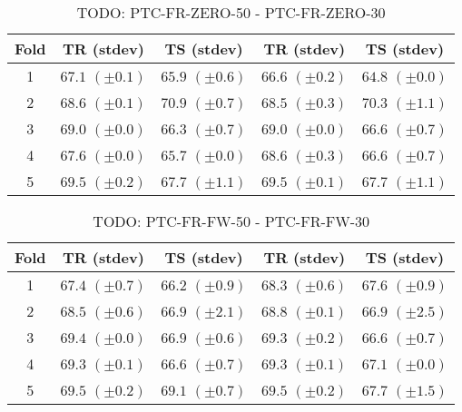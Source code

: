 \documentclass[10pt,a4paper]{book}
\begin{document}
\clearpage


\begin{table}[tbph]
\caption{TODO: PTC-FR-ZERO-50 - PTC-FR-ZERO-30}
\label{TODO}
\centering
\begin{tabular}{c*{4}{c}}
\toprule
Fold & TR (stdev) & TS (stdev) & TR (stdev) & TS (stdev)\\
\midrule
1 & $67.1$ $(\pm 0.1)$ & $65.9$ $(\pm 0.6)$ & $66.6$ $(\pm 0.2)$ & $64.8$ $(\pm 0.0)$\\
2 & $68.6$ $(\pm 0.1)$ & $70.9$ $(\pm 0.7)$ & $68.5$ $(\pm 0.3)$ & $70.3$ $(\pm 1.1)$\\
3 & $69.0$ $(\pm 0.0)$ & $66.3$ $(\pm 0.7)$ & $69.0$ $(\pm 0.0)$ & $66.6$ $(\pm 0.7)$\\
4 & $67.6$ $(\pm 0.0)$ & $65.7$ $(\pm 0.0)$ & $68.6$ $(\pm 0.3)$ & $66.6$ $(\pm 0.7)$\\
5 & $69.5$ $(\pm 0.2)$ & $67.7$ $(\pm 1.1)$ & $69.5$ $(\pm 0.1)$ & $67.7$ $(\pm 1.1)$\\
\bottomrule
\end{tabular}
\end{table}





\begin{table}[tbph]
\caption{TODO: PTC-FR-FW-50 - PTC-FR-FW-30}
\label{TODO}
\centering
\begin{tabular}{c*{4}{c}}
\toprule
Fold & TR (stdev) & TS (stdev) & TR (stdev) & TS (stdev)\\
\midrule
1 & $67.4$ $(\pm 0.7)$ & $66.2$ $(\pm 0.9)$ & $68.3$ $(\pm 0.6)$ & $67.6$ $(\pm 0.9)$\\
2 & $68.5$ $(\pm 0.6)$ & $66.9$ $(\pm 2.1)$ & $68.8$ $(\pm 0.1)$ & $66.9$ $(\pm 2.5)$\\
3 & $69.4$ $(\pm 0.0)$ & $66.9$ $(\pm 0.6)$ & $69.3$ $(\pm 0.2)$ & $66.6$ $(\pm 0.7)$\\
4 & $69.3$ $(\pm 0.1)$ & $66.6$ $(\pm 0.7)$ & $69.3$ $(\pm 0.1)$ & $67.1$ $(\pm 0.0)$\\
5 & $69.5$ $(\pm 0.2)$ & $69.1$ $(\pm 0.7)$ & $69.5$ $(\pm 0.2)$ & $67.7$ $(\pm 1.5)$\\
\bottomrule
\end{tabular}
\end{table}
\end{document}
